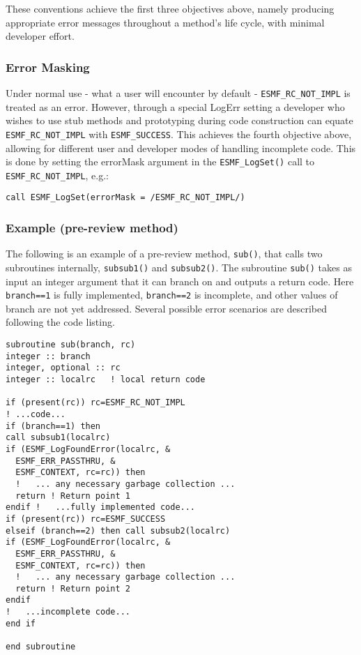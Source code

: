 These conventions achieve the first three objectives above, namely producing appropriate error messages throughout a method's life cycle, with minimal developer effort.

\subsubsection{Error Masking}

Under normal use - what a user will encounter by default - {\tt ESMF\_RC\_NOT\_IMPL} is treated as an error. However, through a special LogErr setting a developer who wishes to use stub methods and prototyping during code construction can equate {\tt ESMF\_RC\_NOT\_IMPL} with {\tt ESMF\_SUCCESS}. This achieves the fourth objective above, allowing for different user and developer modes of handling incomplete code. This is done by setting the errorMask argument in the {\tt ESMF\_LogSet()} call to {\tt ESMF\_RC\_NOT\_IMPL}, e.g.:

\begin{verbatim}
call ESMF_LogSet(errorMask = /ESMF_RC_NOT_IMPL/)
\end{verbatim}

\subsubsection{Example (pre-review method)}

The following is an example of a pre-review method, {\tt sub()}, that calls two subroutines internally, {\tt subsub1()} and {\tt subsub2()}. The subroutine {\tt sub()} takes as input an integer argument that it can branch on and outputs a return code. Here {\tt branch==1} is fully implemented, {\tt branch==2} is incomplete, and other values of branch are not yet addressed. Several possible error scenarios are described following the code listing.

\begin{verbatim}
subroutine sub(branch, rc)
integer :: branch
integer, optional :: rc
integer :: localrc   ! local return code

if (present(rc)) rc=ESMF_RC_NOT_IMPL
! ...code...
if (branch==1) then
call subsub1(localrc)
if (ESMF_LogFoundError(localrc, &
  ESMF_ERR_PASSTHRU, &
  ESMF_CONTEXT, rc=rc)) then
  !   ... any necessary garbage collection ...
  return ! Return point 1
endif !   ...fully implemented code...
if (present(rc)) rc=ESMF_SUCCESS
elseif (branch==2) then call subsub2(localrc)
if (ESMF_LogFoundError(localrc, &
  ESMF_ERR_PASSTHRU, &
  ESMF_CONTEXT, rc=rc)) then
  !   ... any necessary garbage collection ...
  return ! Return point 2
endif
!   ...incomplete code...
end if

end subroutine
\end{verbatim}

